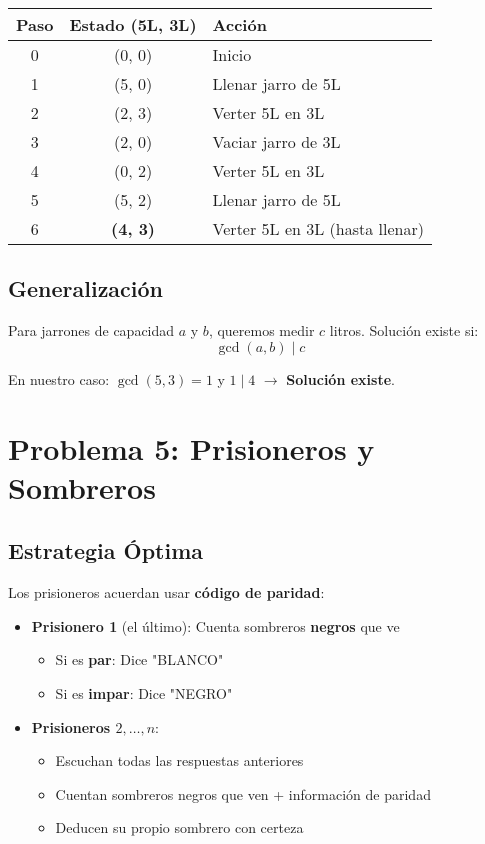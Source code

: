 \documentclass[12pt]{article}
\begin{document}
\begin{center}
\begin{tabular}{c|c|l}
Paso & Estado (5L, 3L) & Acción \\
\hline
0 & (0, 0) & Inicio \\
1 & (5, 0) & Llenar jarro de 5L \\
2 & (2, 3) & Verter 5L en 3L \\
3 & (2, 0) & Vaciar jarro de 3L \\
4 & (0, 2) & Verter 5L en 3L \\
5 & (5, 2) & Llenar jarro de 5L \\
6 & \textbf{(4, 3)} & Verter 5L en 3L (hasta llenar) \\
\end{tabular}
\end{center}

\subsection*{Generalización}

Para jarrones de capacidad $a$ y $b$, queremos medir $c$ litros. Solución existe si:
\[
\gcd(a, b) \mid c
\]

En nuestro caso: $\gcd(5, 3) = 1$ y $1 \mid 4$ $\rightarrow$ \textbf{Solución existe}.

\section*{Problema 5: Prisioneros y Sombreros}
\subsection*{Estrategia Óptima}

Los prisioneros acuerdan usar \textbf{código de paridad}:

\begin{itemize}
    \item \textbf{Prisionero 1} (el último): Cuenta sombreros \textbf{negros} que ve
    \begin{itemize}
        \item Si es \textbf{par}: Dice "BLANCO"
        \item Si es \textbf{impar}: Dice "NEGRO"
    \end{itemize}
    
    \item \textbf{Prisioneros $2, \ldots, n$}: 
    \begin{itemize}
        \item Escuchan todas las respuestas anteriores
        \item Cuentan sombreros negros que ven + información de paridad
        \item Deducen su propio sombrero con certeza
    \end{itemize}
\end{itemize}
\end{document}

